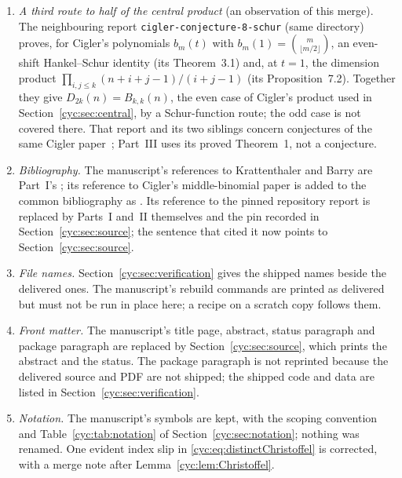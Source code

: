 \documentclass[11pt,a4paper]{article}
\numberwithin{equation}{section}
\theoremstyle{definition}
\theoremstyle{remark}
\begin{document}
\begin{enumerate}[leftmargin=*,itemsep=2pt]
 contains.  As an observation of this merge, the leading coefficients
 \eqref{cyc:eq:ell} reproduce all five leading coefficients of Part~II's
 order-fifteen example (the table before \eqref{rc:eq:chi15}, at $z=2$)
 and the two constants of \eqref{rc:eq:squarecentral}: the two sector
 normalizations agree.  No statement of Parts~I or~II was changed.
\item \emph{A third route to half of the central product} (an observation
 of this merge).  The neighbouring report
 \nolinkurl{cigler-conjecture-8-schur} (same directory) proves, for
 Cigler's polynomials $b_m(t)$ with $b_m(1)=\binom m{\lfloor m/2\rfloor}$,
 an even-shift Hankel--Schur identity (its Theorem~3.1) and, at $t=1$, the
 dimension product $\prod_{i,j\le k}(n+i+j-1)/(i+j-1)$ (its
 Proposition~7.2).  Together they give $D_{2k}(n)=B_{k,k}(n)$, the even case
 of Cigler's product used in Section~\ref{cyc:sec:central}, by a
 Schur-function route; the odd case is not covered there.  That report and
 its two siblings concern conjectures of the same Cigler
 paper~\cite{Cigler2021}; Part~III uses its proved Theorem~1, not a
 conjecture.
\item \emph{Bibliography.}  The manuscript's references to Krattenthaler and
 Barry are Part~I's \cite{Krattenthaler2023,Barry2020}; its reference to
 Cigler's middle-binomial paper is added to the common bibliography as
 \cite{Cigler2021}.  Its reference to the pinned repository report is
 replaced by Parts~I and~II themselves and the pin recorded in
 Section~\ref{cyc:sec:source}; the sentence that cited it now points to
 Section~\ref{cyc:sec:source}.
\item \emph{File names.}  Section~\ref{cyc:sec:verification} gives the
 shipped names beside the delivered ones.  The manuscript's rebuild
 commands are printed as delivered but must not be run in place here;
 a recipe on a scratch copy follows them.
\item \emph{Front matter.}  The manuscript's title page, abstract, status
 paragraph and package paragraph are replaced by
 Section~\ref{cyc:sec:source}, which prints the abstract and the status.
 The package paragraph is not reprinted because the delivered source and
 PDF are not shipped; the shipped code and data are listed in
 Section~\ref{cyc:sec:verification}.
\item \emph{Notation.}  The manuscript's symbols are kept, with the scoping
 convention and Table~\ref{cyc:tab:notation} of
 Section~\ref{cyc:sec:notation}; nothing was renamed.  One evident index
 slip in \eqref{cyc:eq:distinctChristoffel} is corrected, with a merge note
 after Lemma~\ref{cyc:lem:Christoffel}.
\end{enumerate}
\end{document}
